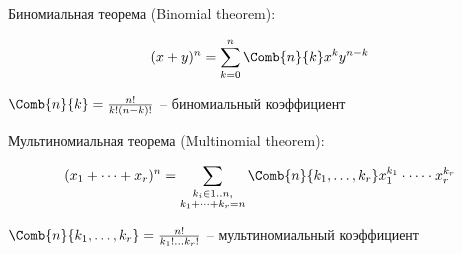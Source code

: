 \documentclass[12pt]{article}
\begin{document}
    \begin{MyTheorem}
        \Ths Биномиальная теорема (Binomial theorem):

        \[(x + y)^n = \sum_{k=0}^n \Comb{n}{k} x^k y^{n - k}\]
    \end{MyTheorem}

    $\Comb{n}{k} = \frac{n!}{k!(n - k)!}$ -- биномиальный коэффициент

    \begin{MyTheorem}
        \Ths Мультиномиальная теорема (Multinomial theorem):

        \[(x_1 + \dots + x_r)^n = \sum_{\substack{k_i \in 1..n, \\ k_1 + \dots + k_r = n}} \Comb{n}{k_1, \dots, k_r} x^{k_1}_1 \cdot \dots \cdot x^{k_r}_r\]
    \end{MyTheorem}

    $\Comb{n}{k_1, \dots, k_r} = \frac{n!}{k_1! \dots k_r!}$ -- мультиномиальный коэффициент
\end{document}

